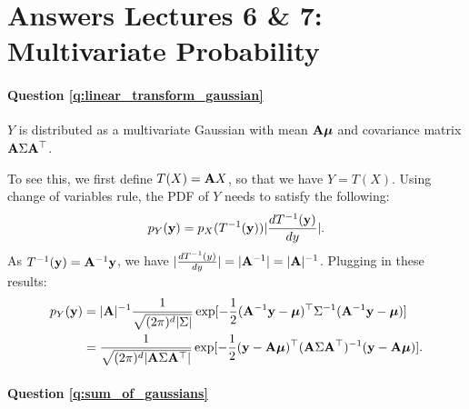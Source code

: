\section{Answers Lectures 6 \& 7: Multivariate Probability}

\paragraph{Question \ref{q:linear_transform_gaussian}}
$Y$ is distributed as a multivariate Gaussian with mean $\mathbf A \bm{\mu}$ and covariance matrix $\mathbf A \Sigma \mathbf A^\top$.

To see this, we first define $T(X) = \mathbf A X$, so that we have $Y = T(X)$. Using change of variables rule, the PDF of $Y$ needs to satisfy the following:
$$p_Y(\mathbf{y}) = p_X(T^{-1}(\mathbf{y})) | \frac{dT^{-1}(\mathbf{y})}{dy} | .$$
As $T^{-1}(\mathbf{y}) = \mathbf A^{-1} \mathbf{y}$, we have $| \frac{dT^{-1}(y)}{dy} | = | \mathbf A^{-1} | = | \mathbf A |^{-1}$. Plugging in these results:
\begin{equation*}
\begin{aligned}
p_Y(\mathbf{y}) &=  |\mathbf A |^{-1} \frac{1}{\sqrt{(2 \pi)^d |\Sigma|}} \exp[-\frac{1}{2} (\mathbf A^{-1} \mathbf{y} - \bm{\mu})^\top \Sigma^{-1} (\mathbf A^{-1} \mathbf{y} - \bm{\mu})] \\
& = \frac{1}{\sqrt{(2 \pi)^d |\mathbf A \Sigma \mathbf A^\top|}} \exp[-\frac{1}{2} (\mathbf{y} - \mathbf A \bm{\mu})^\top (\mathbf A \Sigma \mathbf A^{\top})^{-1} ( \mathbf{y} - \mathbf A \bm{\mu})].
\end{aligned}
\end{equation*}

\paragraph{Question \ref{q:sum_of_gaussians}}

